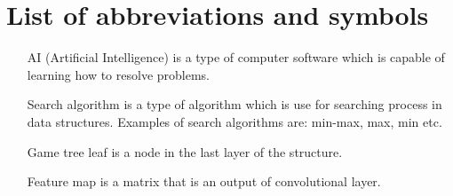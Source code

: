 \chapter{List of abbreviations and symbols}

\begin{itemize}
    \item[AI] (Artificial Intelligence) is a type of computer software which is capable of learning how to resolve problems.
    \item[Search algorithm] is a type of algorithm which is use for searching process in data structures. Examples of search algorithms are: min-max, max, min etc.
    \item[Game tree leaf] is a node in the last layer of the structure.
    \item[Feature map] is a matrix that is an output of convolutional layer.  
\end{itemize}

